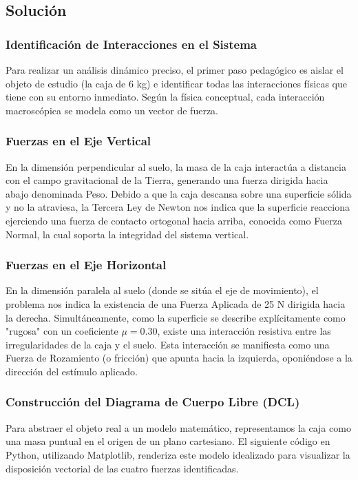 \documentclass[12pt]{article}
\begin{document}
\subsection*{Solución}

\subsubsection*{Identificación de Interacciones en el Sistema}
Para realizar un análisis dinámico preciso, el primer paso pedagógico es aislar el objeto de estudio (la caja de 6 kg) e identificar todas las interacciones físicas que tiene con su entorno inmediato. Según la física conceptual, cada interacción macroscópica se modela como un vector de fuerza. 

\subsubsection*{Fuerzas en el Eje Vertical}
En la dimensión perpendicular al suelo, la masa de la caja interactúa a distancia con el campo gravitacional de la Tierra, generando una fuerza dirigida hacia abajo denominada Peso. Debido a que la caja descansa sobre una superficie sólida y no la atraviesa, la Tercera Ley de Newton nos indica que la superficie reacciona ejerciendo una fuerza de contacto ortogonal hacia arriba, conocida como Fuerza Normal, la cual soporta la integridad del sistema vertical.

\subsubsection*{Fuerzas en el Eje Horizontal}
En la dimensión paralela al suelo (donde se sitúa el eje de movimiento), el problema nos indica la existencia de una Fuerza Aplicada de 25 N dirigida hacia la derecha. Simultáneamente, como la superficie se describe explícitamente como "rugosa" con un coeficiente $\mu = 0.30$, existe una interacción resistiva entre las irregularidades de la caja y el suelo. Esta interacción se manifiesta como una Fuerza de Rozamiento (o fricción) que apunta hacia la izquierda, oponiéndose a la dirección del estímulo aplicado.

\subsubsection*{Construcción del Diagrama de Cuerpo Libre (DCL)}
Para abstraer el objeto real a un modelo matemático, representamos la caja como una masa puntual en el origen de un plano cartesiano. El siguiente código en Python, utilizando Matplotlib, renderiza este modelo idealizado para visualizar la disposición vectorial de las cuatro fuerzas identificadas.
\end{document}
